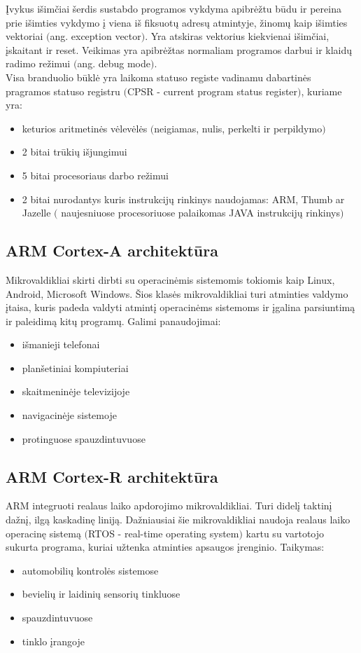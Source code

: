 \documentclass[a4paper, 12pt]{article} %
\begin{document}
\begin{onehalfspacing}
\indent \k{I}vykus i\v{s}im\v{c}iai \v{s}erdis sustabdo programos vykdyma apibr\.{e}\v{z}tu b\={u}du ir pereina prie i\v{s}imties vykdymo \k{i} viena i\v{s} fiksuot\k{u} adres\k{u} atmintyje, \v{z}inom\k{u} kaip i\v{s}imties vektoriai $($ang. exception vector$)$. Yra atskiras vektorius kiekvienai i\v{s}im\v{c}iai, \k{i}skaitant ir reset. Veikimas yra apibr\.{e}\v{z}tas normaliam programos darbui ir klaid\k{u} radimo re\v{z}imui $($ang. debug mode$)$.  \\
\indent Visa branduolio b\={u}kl\.{e} yra laikoma statuso registe vadinamu dabartin\.{e}s pragramos statuso registru $($CPSR - current program status register$)$, kuriame yra:
\begin{itemize}
\item keturios aritmetin\.{e}s v\.{e}lev\.{e}l\.{e}s $($neigiamas, nulis, perkelti ir perpildymo$)$
\item 2 bitai tr\={u}ki\k{u} i\v{s}jungimui
\item 5 bitai procesoriaus darbo re\v{z}imui
\item 2 bitai nurodantys kuris instrukcij\k{u} rinkinys naudojamas: ARM, Thumb ar Jazelle  $($ naujesniuose procesoriuose palaikomas JAVA instrukcij\k{u} rinkinys$)$
\end{itemize}
\subsection{ARM Cortex-A architekt\={u}ra}
Mikrovaldikliai skirti dirbti su operacin\.{e}mis sistemomis tokiomis kaip Linux, Android, Microsoft Windows. \v{S}ios klas\.{e}s mikrovaldikliai turi atminties valdymo \k{i}taisa, kuris padeda valdyti atmint\k{i} operacin\.{e}ms sistemoms ir \k{i}galina parsiuntim\k{a} ir paleidim\k{a} kit\k{u} program\k{u}. Galimi panaudojimai:
\begin{itemize}
\item i\v{s}manieji telefonai
\item plan\v{s}etiniai kompiuteriai
\item skaitmenin\.{e}je televizijoje
\item navigacin\.{e}je sistemoje
\item protinguose spauzdintuvuose
\end{itemize}

\subsection{ARM Cortex-R architekt\={u}ra}
ARM integruoti realaus laiko apdorojimo mikrovaldikliai. Turi didel\k{i} taktin\k{i} da\v{z}n\k{i}, ilg\k{a} kaskadin\k{e} linij\k{a}. Da\v{z}niausiai \v{s}ie mikrovaldikliai naudoja realaus laiko operacin\k{e} sistem\k{a} $($RTOS - real-time operating system$)$ kartu su vartotojo sukurta programa, kuriai u\v{z}tenka atminties apsaugos \k{i}renginio. Taikymas:
\begin{itemize}
\item automobili\k{u} kontrol\.{e}s sistemose
\item bevieli\k{u} ir laidini\k{u} sensori\k{u} tinkluose
\item spauzdintuvuose
\item tinklo \k{i}rangoje
\end{itemize}

\end{onehalfspacing}
\end{document}
